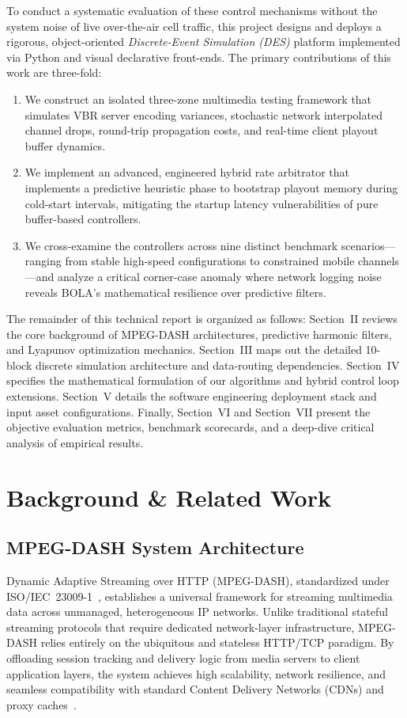 \documentclass[conference]{IEEEtran}
\begin{document}
To conduct a systematic evaluation of these control mechanisms without the system noise of live over-the-air cell traffic, this project designs and deploys a rigorous, object-oriented \emph{Discrete-Event Simulation (DES)} platform implemented via Python and visual declarative front-ends. The primary contributions of this work are three-fold:
\begin{enumerate}
    \item We construct an isolated three-zone multimedia testing framework that simulates VBR server encoding variances, stochastic network interpolated channel drops, round-trip propagation costs, and real-time client playout buffer dynamics.
    \item We implement an advanced, engineered hybrid rate arbitrator that implements a predictive heuristic phase to bootstrap playout memory during cold-start intervals, mitigating the startup latency vulnerabilities of pure buffer-based controllers.
    \item We cross-examine the controllers across nine distinct benchmark scenarios—ranging from stable high-speed configurations to constrained mobile channels—and analyze a critical corner-case anomaly where network logging noise reveals BOLA's mathematical resilience over predictive filters.
\end{enumerate}

The remainder of this technical report is organized as follows: Section~II reviews the core background of MPEG-DASH architectures, predictive harmonic filters, and Lyapunov optimization mechanics. Section~III maps out the detailed 10-block discrete simulation architecture and data-routing dependencies. Section~IV specifies the mathematical formulation of our algorithms and hybrid control loop extensions. Section~V details the software engineering deployment stack and input asset configurations. Finally, Section~VI and Section~VII present the objective evaluation metrics, benchmark scorecards, and a deep-dive critical analysis of empirical results.

\section{Background \& Related Work}

\subsection{MPEG-DASH System Architecture}

Dynamic Adaptive Streaming over HTTP (MPEG-DASH), standardized under
ISO/IEC~23009-1~\cite{iso23009}, establishes a universal framework for
streaming multimedia data across unmanaged, heterogeneous IP networks.
Unlike traditional stateful streaming protocols that require dedicated
network-layer infrastructure, MPEG-DASH relies entirely on the ubiquitous
and stateless HTTP/TCP paradigm.  By offloading session tracking and
delivery logic from media servers to client application layers, the system
achieves high scalability, network resilience, and seamless compatibility
with standard Content Delivery Networks (CDNs) and proxy
caches~\cite{jiang2012}.
\end{document}
